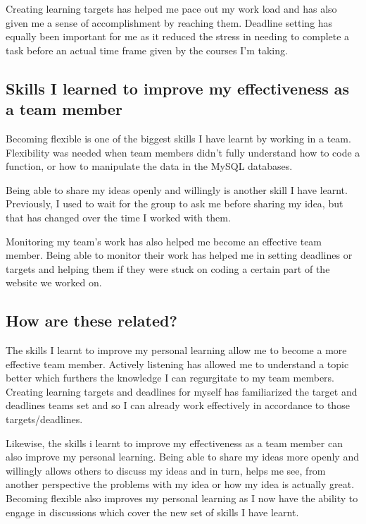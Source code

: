 \documentclass[12pt,a4paper]{article}
\begin{document}
Creating learning targets has helped me pace out my work load and has also given me a sense
of accomplishment by reaching them. Deadline setting has equally been important for me
as it reduced the stress in needing to complete a task before an actual time frame given
by the courses I'm taking.

\subsection{Skills I learned to improve my effectiveness as a team member}

Becoming flexible is one of the biggest skills I have learnt by working in a team.
Flexibility was needed when team members didn't fully understand how to code a function,
or how to manipulate the data in the MySQL databases. 

Being able to share my ideas openly and willingly is another skill I have learnt. Previously,
I used to wait for the group to ask me before sharing my idea, but that has changed over the time
I worked with them.

Monitoring my team's work has also helped me become an effective team member. 
Being able to monitor their work has helped me in setting deadlines or targets and
helping them if they were stuck on coding a certain part of the website we worked on. 

\newpage
\subsection{How are these related?}        

The skills I learnt to improve my personal learning allow me to become a more effective team member.
Actively listening has allowed me to understand  a topic better which furthers the knowledge I can 
regurgitate to my team members. Creating learning targets and deadlines for myself has familiarized
the target and deadlines teams set and so I can already work effectively in accordance to those
targets/deadlines.

Likewise, the skills i learnt to improve my effectiveness as a team member can also improve my personal
learning. Being able to share my ideas more openly and willingly allows others to discuss my ideas
and in turn, helps me see, from another perspective the problems with my idea or how my idea is actually great.
Becoming flexible also improves my personal learning as I now have the ability to engage in discussions
which cover the new set of skills I have learnt. 
\end{document}
